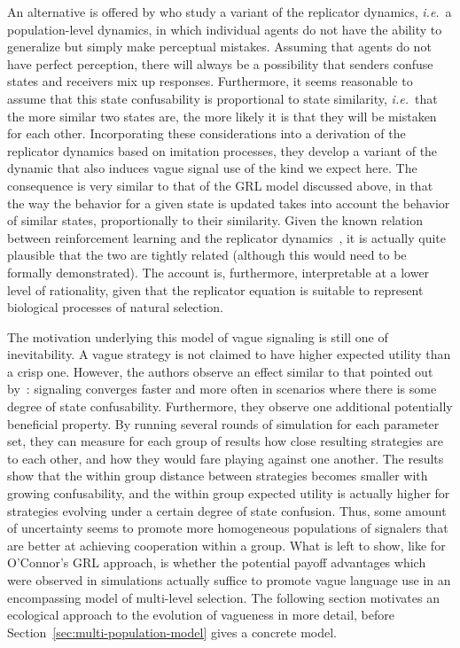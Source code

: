 \documentclass[a4paper]{article}
\begin{document}
An alternative is offered by \textcite{franke_vagueness_2017} who study a variant of the replicator dynamics, \emph{i.e.}~a population-level dynamics, in which individual agents do not have the ability to generalize but simply make perceptual mistakes. 
Assuming that agents do not have perfect perception, there will always be a possibility that senders confuse states and receivers mix up responses.
Furthermore, it seems reasonable to assume that this state confusability is proportional to state similarity, \emph{i.e.}~that the more similar two states are, the more likely it is that they will be mistaken for each other.
Incorporating these considerations into a derivation of the replicator dynamics based on imitation processes, they develop a variant of the dynamic that also induces vague signal use of the kind we expect here.
The consequence is very similar to that of the GRL model discussed above, in that the way the behavior for a given state is updated takes into account the behavior of similar states, proportionally to their similarity.
Given the known relation between reinforcement learning and the replicator dynamics~\parencite{Beggs2005}, it is actually quite plausible that the two are tightly related (although this would need to be formally demonstrated).
The account is, furthermore, interpretable at a lower level of rationality, given that the replicator equation is suitable to represent biological processes of natural selection.

The motivation underlying this model of vague signaling is still one of inevitability.
A vague strategy is not claimed to have higher expected utility than a crisp one.
However, the authors observe an effect similar to that pointed out by~\citeauthor{oconnor_evolution_2014}: signaling converges faster and more often in scenarios where there is some degree of state confusability.
Furthermore, they observe one additional potentially beneficial property.
By running several rounds of simulation for each parameter set, they can measure for each group of results how close resulting strategies are to each other, and how they would fare playing against one another.
The results show that the within group distance between strategies becomes smaller with growing confusability, and the within group expected utility is actually higher for strategies evolving under a certain degree of state confusion.
Thus, some amount of uncertainty seems to promote more homogeneous populations of signalers that are better at achieving cooperation within a group.
What is left to show, like for O'Connor's GRL approach, is whether the potential payoff advantages which were observed in simulations actually suffice to promote vague language use in an encompassing model of multi-level selection. The following section motivates an ecological approach to the evolution of vagueness in more detail, before Section~\ref{sec:multi-population-model} gives a concrete model.
\end{document}
